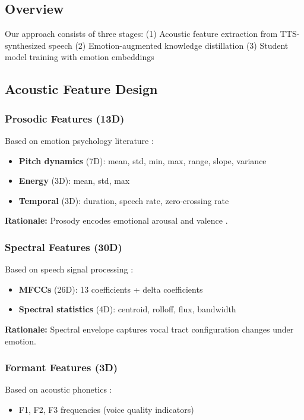 
\subsection{Overview}
Our approach consists of three stages:
(1) Acoustic feature extraction from TTS-synthesized speech
(2) Emotion-augmented knowledge distillation
(3) Student model training with emotion embeddings

\subsection{Acoustic Feature Design}
\label{subsec:acoustic_features}

\subsubsection{Prosodic Features (13D)}
Based on emotion psychology literature \cite{TODO}:
\begin{itemize}
    \item \textbf{Pitch dynamics} (7D): mean, std, min, max, range, slope, variance
    \item \textbf{Energy} (3D): mean, std, max
    \item \textbf{Temporal} (3D): duration, speech rate, zero-crossing rate
\end{itemize}

\textbf{Rationale:} Prosody encodes emotional arousal and valence \cite{TODO}.

\subsubsection{Spectral Features (30D)}
Based on speech signal processing \cite{TODO}:
\begin{itemize}
    \item \textbf{MFCCs} (26D): 13 coefficients + delta coefficients
    \item \textbf{Spectral statistics} (4D): centroid, rolloff, flux, bandwidth
\end{itemize}

\textbf{Rationale:} Spectral envelope captures vocal tract configuration changes under emotion.

\subsubsection{Formant Features (3D)}
Based on acoustic phonetics \cite{TODO}:
\begin{itemize}
    \item F1, F2, F3 frequencies (voice quality indicators)
\end{itemize}

